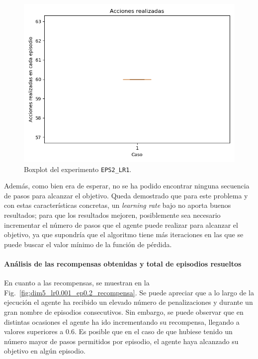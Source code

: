\begin{figure}
    \centering
    \includegraphics[scale=0.4]{cap5_experimentacion/images/dim5_lr0.001_ep0.2_boxplot.png}
    \caption{Boxplot del experimento \texttt{EPS2\_LR1}.}
    \label{fig:dim5_lr0.001_ep0.2_boxplot}
\end{figure}

Además, como bien era de esperar, no se ha podido encontrar ninguna secuencia de pasos para alcanzar el objetivo. Queda demostrado que para este problema y con estas características concretas, un  \textit{learning rate} bajo no aporta buenos resultados; para que los resultados mejoren, posiblemente sea necesario incrementar el número de pasos que el agente puede realizar para alcanzar el objetivo, ya que supondría que el algoritmo tiene más iteraciones en las que se puede buscar el valor mínimo de la función de pérdida. 

\paragraph{Análisis de las recompensas obtenidas y total de episodios resueltos} 

En cuanto a las recompensas, se muestran en la Fig.~\ref{fig:dim5_lr0.001_ep0.2_recompensa}. Se puede apreciar que a lo largo de la ejecución el agente ha recibido un elevado número de penalizaciones y durante un gran nombre de episodios consecutivos. Sin embargo, se puede observar que en distintas ocasiones el agente ha ido incrementando su recompensa, llegando a valores superiores a 0.6. Es posible que en el caso de que hubiese tenido un número mayor de pasos permitidos por episodio, el agente haya alcanzado su objetivo en algún episodio. \\

